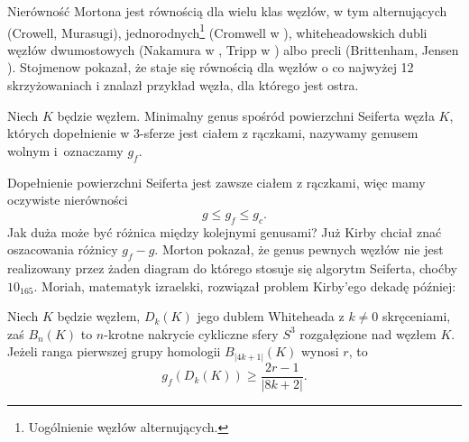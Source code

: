 Nierówność Mortona jest równością dla wielu klas węzłów, w tym
%
alternujących (Crowell, Murasugi),
%
%
%
jednorodnych\footnote{Uogólnienie węzłów alternujących.} (Cromwell w \cite{cromwell89}),
%
%
whiteheadowskich dubli węzłów dwumostowych (Nakamura w \cite{nakamura06}, Tripp w \cite{tripp02}) albo
%
%
%
%
precli (Brittenham, Jensen \cite{brittenham06}).
%
%
%
Stojmenow pokazał, że staje się równością dla węzłów o co najwyżej 12 skrzyżowaniach i znalazł przykład węzła, dla którego jest ostra.
%

\begin{definition}
%
%
    Niech $K$ będzie węzłem.
    Minimalny genus spośród powierzchni Seiferta węzła $K$, których dopełnienie w 3-sferze jest ciałem z rączkami, nazywamy genusem wolnym i~oznaczamy $g_f$.
\end{definition}

Dopełnienie powierzchni Seiferta jest zawsze ciałem z rączkami, więc mamy oczywiste nierówności
\begin{equation}
    g \le g_f \le g_c.
\end{equation}
Jak duża może być różnica między kolejnymi genusami?
Już Kirby \cite[problem 1.20a]{kirby78} chciał znać oszacowania różnicy $g_f - g$.
Morton \cite{morton86} pokazał, że genus pewnych węzłów nie jest realizowany przez żaden diagram do którego stosuje się algorytm Seiferta, choćby $10_{165}$.
%
Moriah, matematyk izraelski, rozwiązał problem Kirby'ego dekadę później:
%

\begin{proposition}
    Niech $K$ będzie węzłem, $D_k(K)$ jego dublem Whiteheada z $k \neq 0$ skręceniami, zaś $B_n(K)$ to $n$-krotne nakrycie cykliczne sfery $S^3$ rozgałęzione nad węzłem $K$.
    Jeżeli ranga pierwszej grupy homologii $B_{|4k+1|}(K)$ wynosi $r$, to
    \begin{equation}
        g_f(D_k(K)) \ge \frac {2r-1} {|8k+2|}.
    \end{equation}
\end{proposition}

